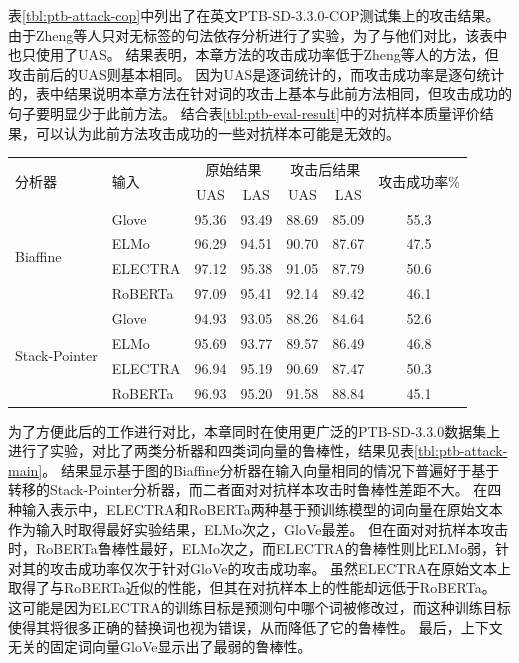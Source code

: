 表\ref{tbl:ptb-attack-cop}中列出了在英文PTB-SD-3.3.0-COP测试集上的攻击结果。
由于Zheng等人只对无标签的句法依存分析进行了实验，为了与他们对比，该表中也只使用了UAS。
结果表明，本章方法的攻击成功率低于Zheng等人的方法，但攻击前后的UAS则基本相同。
因为UAS是逐词统计的，而攻击成功率是逐句统计的，表中结果说明本章方法在针对词的攻击上基本与此前方法相同，但攻击成功的句子要明显少于此前方法。
结合表\ref{tbl:ptb-eval-result}中的对抗样本质量评价结果，可以认为此前方法攻击成功的一些对抗样本可能是无效的。

\begin{table}[htbp]
    \vspace{0.5em}\centering\wuhao
	\begin{tabular}{llccccc}
		\toprule[1.5pt]
		\multirow{2}{*}{分析器}&\multirow{2}{*}{输入}& \multicolumn{2}{c}{原始结果} & \multicolumn{2}{c}{攻击后结果} & \multirow{2}{*}{攻击成功率\%} \\
		\cmidrule(r){3-4} \cmidrule(r){5-6}
		& & UAS & LAS & UAS & LAS \\
		\midrule[1pt]
		\multirow{4}{*}{ Biaffine} & Glove &95.36 & 93.49 &88.69 &85.09 &55.3 \\
		& ELMo  &96.29 &94.51  &90.70 &87.67 &47.5 \\
		& ELECTRA &97.12 & 95.38 &91.05 &87.79 &50.6 \\
		& RoBERTa &97.09 & 95.41 &92.14 &89.42 &46.1 \\
		\hline
		\multirow{4}{*}{ Stack-Pointer} & Glove &94.93 & 93.05 &88.26 &84.64 &52.6 \\
		& ELMo    &95.69 & 93.77 &89.57 &86.49 &46.8 \\
		& ELECTRA &96.94 & 95.19 &90.69 &87.47 &50.3 \\
		& RoBERTa &96.93 & 95.20 &91.58 &88.84 &45.1 \\
		\bottomrule[1.5pt]
	\end{tabular}
\end{table}

为了方便此后的工作进行对比，本章同时在使用更广泛的PTB-SD-3.3.0数据集上进行了实验，对比了两类分析器和四类词向量的鲁棒性，结果见表\ref{tbl:ptb-attack-main}。
结果显示基于图的Biaffine分析器在输入向量相同的情况下普遍好于基于转移的Stack-Pointer分析器，而二者面对对抗样本攻击时鲁棒性差距不大。
在四种输入表示中，ELECTRA和RoBERTa两种基于预训练模型的词向量在原始文本作为输入时取得最好实验结果，ELMo次之，GloVe最差。
但在面对对抗样本攻击时，RoBERTa鲁棒性最好，ELMo次之，而ELECTRA的鲁棒性则比ELMo弱，针对其的攻击成功率仅次于针对GloVe的攻击成功率。
虽然ELECTRA在原始文本上取得了与RoBERTa近似的性能，但其在对抗样本上的性能却远低于RoBERTa。
这可能是因为ELECTRA的训练目标是预测句中哪个词被修改过，而这种训练目标使得其将很多正确的替换词也视为错误，从而降低了它的鲁棒性。
最后，上下文无关的固定词向量GloVe显示出了最弱的鲁棒性。


